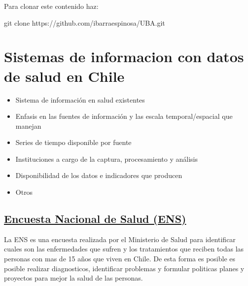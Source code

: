 \documentclass[]{book}
\newenvironment{Shaded}{\begin{snugshade}}{\end{snugshade}}
\newcommand{\FunctionTok}[1]{\textcolor[rgb]{0.00,0.00,0.00}{#1}}
\newcommand{\NormalTok}[1]{#1}
\providecommand{\tightlist}{%
  \setlength{\itemsep}{0pt}\setlength{\parskip}{0pt}}
\begin{document}
Para clonar este contenido haz:

\begin{Shaded}
\begin{Highlighting}[]
\FunctionTok{git}\NormalTok{ clone https://github.com/ibarraespinosa/UBA.git}
\end{Highlighting}
\end{Shaded}

\hypertarget{intro}{%
\chapter{Sistemas de informacion con datos de salud en Chile}\label{intro}}

\begin{itemize}
\tightlist
\item
  Sistema de información en salud existentes
\item
  Enfasis en las fuentes de información y las escala temporal/espacial que manejan
\item
  Series de tiempo disponible por fuente
\item
  Instituciones a cargo de la captura, procesamiento y análisis
\item
  Disponibilidad de los datos e indicadores que producen
\item
  Otros
\end{itemize}

\hypertarget{encuesta-nacional-de-salud-ens}{%
\section{\texorpdfstring{\href{http://www.encuestas.uc.cl/ens/index.html}{Encuesta Nacional de Salud (ENS)}}{Encuesta Nacional de Salud (ENS)}}\label{encuesta-nacional-de-salud-ens}}

La ENS es una encuesta realizada por el Ministerio de Salud para identificar cuales son las
enfermedades que sufren y los tratamientos que reciben todas las personas con mas de 15 años
que viven en Chile. De esta forma es posible es posible realizar diagnosticos,
identificar problemas y formular politicas planes y proyectos para mejor la salud de las personas.
\end{document}
